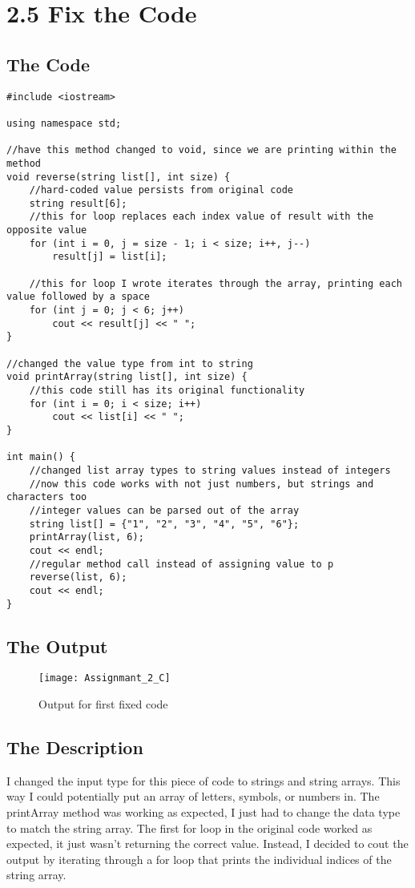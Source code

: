 \documentclass[11pt]{article}
\begin{document}
\section*{2.5 Fix the Code}
\subsection*{The Code}
\begin{lstlisting}
#include <iostream>

using namespace std;

//have this method changed to void, since we are printing within the method
void reverse(string list[], int size) {
    //hard-coded value persists from original code
    string result[6];
    //this for loop replaces each index value of result with the opposite value
    for (int i = 0, j = size - 1; i < size; i++, j--)
        result[j] = list[i];

    //this for loop I wrote iterates through the array, printing each value followed by a space
    for (int j = 0; j < 6; j++)
        cout << result[j] << " ";
}

//changed the value type from int to string
void printArray(string list[], int size) {
    //this code still has its original functionality
    for (int i = 0; i < size; i++)
        cout << list[i] << " ";
}

int main() {
    //changed list array types to string values instead of integers
    //now this code works with not just numbers, but strings and characters too
    //integer values can be parsed out of the array
    string list[] = {"1", "2", "3", "4", "5", "6"};
    printArray(list, 6);
    cout << endl;
    //regular method call instead of assigning value to p
    reverse(list, 6);
    cout << endl;
}
\end{lstlisting}

\subsection{The Output}
\begin{figure}[H]
    \centering
    \texttt{[image: Assignmant\_2\_C]}
    \caption{Output for first fixed code}
    \label{fig:Part 2C}
\end{figure}

\subsection*{The Description}
I changed the input type for this piece of code to strings and string arrays. This way I could potentially put an array of letters, symbols, or numbers in. The printArray method was working as expected, I just had to change the data type to match the string array. The first for loop in the original code worked as expected, it just wasn't returning the correct value. Instead, I decided to cout the output by iterating through a for loop that prints the individual indices of the string array. 
\end{document}
